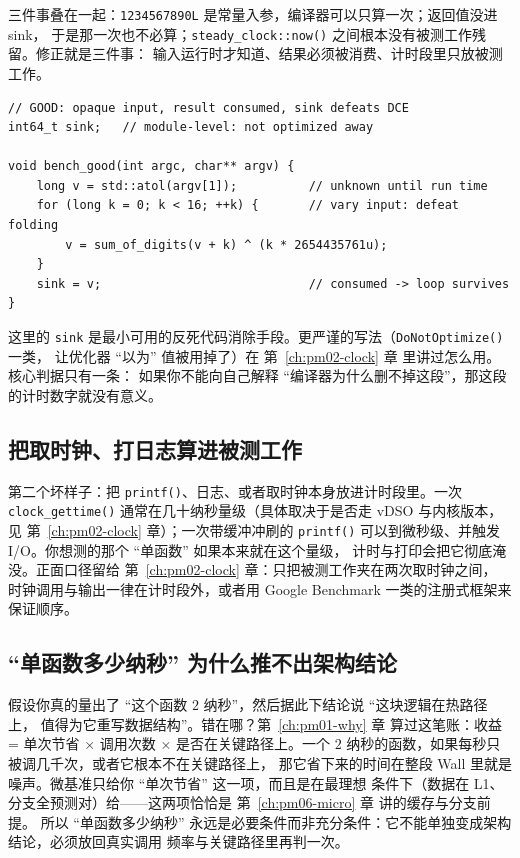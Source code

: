 \documentclass[12pt,a4paper,fontset=fandol]{ctexbook}
\newcommand{\Fn}[1]{\texttt{#1()}}
\newcommand{\Tp}[1]{\texttt{#1}}
\newcommand{\Lang}[1]{\textsf{#1}}
\newcommand{\MWall}{\Lang{Wall}}
\begin{document}
三件事叠在一起：\Tp{1234567890L} 是常量入参，编译器可以只算一次；返回值没进 sink，
于是那一次也不必算；\Fn{steady\_clock::now} 之间根本没有被测工作残留。修正就是三件事：
输入运行时才知道、结果必须被消费、计时段里只放被测工作。

\begin{lstlisting}[style=cppstyle, caption={修正版：来源可变、结果入 sink、时钟选取与调用开销见 ch02（示意代码，数值由读者自己标定）}, label={lst:pm15-goodloop}]
// GOOD: opaque input, result consumed, sink defeats DCE
int64_t sink;   // module-level: not optimized away

void bench_good(int argc, char** argv) {
    long v = std::atol(argv[1]);          // unknown until run time
    for (long k = 0; k < 16; ++k) {       // vary input: defeat folding
        v = sum_of_digits(v + k) ^ (k * 2654435761u);
    }
    sink = v;                             // consumed -> loop survives
}
\end{lstlisting}

这里的 \Tp{sink} 是最小可用的反死代码消除手段。更严谨的写法（\Fn{DoNotOptimize} 一类，
让优化器 ``以为'' 值被用掉了）在 第~\ref{ch:pm02-clock} 章 里讲过怎么用。核心判据只有一条：
如果你不能向自己解释 ``编译器为什么删不掉这段''，那这段的计时数字就没有意义。

\subsection{把取时钟、打日志算进被测工作}

第二个坏样子：把 \Fn{printf}、日志、或者取时钟本身放进计时段里。一次 \Fn{clock\_gettime}
通常在几十纳秒量级（具体取决于是否走 vDSO 与内核版本，见 第~\ref{ch:pm02-clock} 章）；一次带缓冲冲刷的
\Fn{printf} 可以到微秒级、并触发 I/O。你想测的那个 ``单函数'' 如果本来就在这个量级，
计时与打印会把它彻底淹没。正面口径留给 第~\ref{ch:pm02-clock} 章：只把被测工作夹在两次取时钟之间，
时钟调用与输出一律在计时段外，或者用 Google Benchmark 一类的注册式框架来保证顺序。

\subsection{``单函数多少纳秒'' 为什么推不出架构结论}

假设你真的量出了 ``这个函数 $2$ 纳秒''，然后据此下结论说 ``这块逻辑在热路径上，
值得为它重写数据结构''。错在哪？第~\ref{ch:pm01-why} 章 算过这笔账：收益 = 单次节省 × 调用次数 ×
是否在关键路径上。一个 $2$ 纳秒的函数，如果每秒只被调几千次，或者它根本不在关键路径上，
那它省下来的时间在整段 \MWall{} 里就是噪声。微基准只给你 ``单次节省'' 这一项，而且是在最理想
条件下（数据在 L1、分支全预测对）给——这两项恰恰是 第~\ref{ch:pm06-micro} 章 讲的缓存与分支前提。
所以 ``单函数多少纳秒'' 永远是必要条件而非充分条件：它不能单独变成架构结论，必须放回真实调用
频率与关键路径里再判一次。
\end{document}
